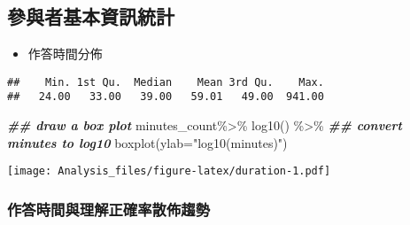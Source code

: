 \documentclass[
]{article}
\newenvironment{Shaded}{\begin{snugshade}}{\end{snugshade}}
\newcommand{\AttributeTok}[1]{\textcolor[rgb]{0.77,0.63,0.00}{#1}}
\newcommand{\DecValTok}[1]{\textcolor[rgb]{0.00,0.00,0.81}{#1}}
\newcommand{\DocumentationTok}[1]{\textcolor[rgb]{0.56,0.35,0.01}{\textbf{\textit{#1}}}}
\newcommand{\FunctionTok}[1]{\textcolor[rgb]{0.00,0.00,0.00}{#1}}
\newcommand{\NormalTok}[1]{#1}
\newcommand{\OtherTok}[1]{\textcolor[rgb]{0.56,0.35,0.01}{#1}}
\newcommand{\SpecialCharTok}[1]{\textcolor[rgb]{0.00,0.00,0.00}{#1}}
\newcommand{\StringTok}[1]{\textcolor[rgb]{0.31,0.60,0.02}{#1}}
\providecommand{\tightlist}{%
  \setlength{\itemsep}{0pt}\setlength{\parskip}{0pt}}
\begin{document}
\hypertarget{ux53c3ux8207ux8005ux57faux672cux8cc7ux8a0aux7d71ux8a08}{%
\subsection{參與者基本資訊統計}\label{ux53c3ux8207ux8005ux57faux672cux8cc7ux8a0aux7d71ux8a08}}

\begin{itemize}
\tightlist
\item
  作答時間分佈
\end{itemize}

\begin{Shaded}
\end{Shaded}

\begin{verbatim}
##    Min. 1st Qu.  Median    Mean 3rd Qu.    Max. 
##   24.00   33.00   39.00   59.01   49.00  941.00
\end{verbatim}

\begin{Shaded}
\begin{Highlighting}[]
\DocumentationTok{\#\# draw a box plot}
\NormalTok{minutes\_count}\SpecialCharTok{\%\textgreater{}\%}
  \FunctionTok{log10}\NormalTok{() }\SpecialCharTok{\%\textgreater{}\%} \DocumentationTok{\#\# convert minutes to log10}
  \FunctionTok{boxplot}\NormalTok{(}\AttributeTok{ylab=}\StringTok{"log10(minutes)"}\NormalTok{)}
\end{Highlighting}
\end{Shaded}

\texttt{[image: Analysis\_files/figure-latex/duration-1.pdf]}

\hypertarget{ux4f5cux7b54ux6642ux9593ux8207ux7406ux89e3ux6b63ux78baux7387ux6563ux4f48ux8da8ux52e2}{%
\subsubsection{作答時間與理解正確率散佈趨勢}\label{ux4f5cux7b54ux6642ux9593ux8207ux7406ux89e3ux6b63ux78baux7387ux6563ux4f48ux8da8ux52e2}}
\end{document}
